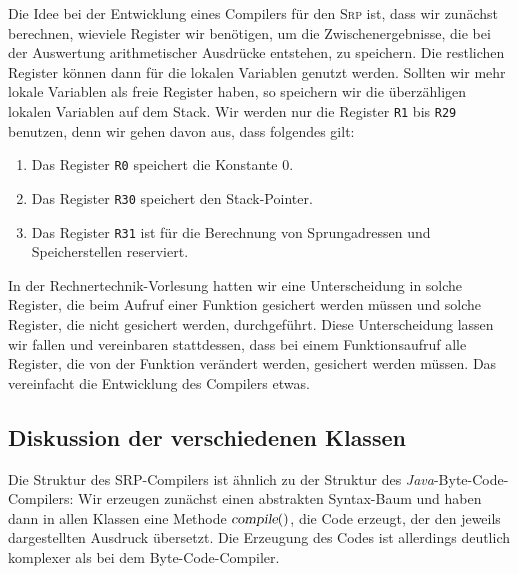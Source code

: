 Die Idee bei der Entwicklung eines Compilers f\"ur den \textsc{Srp} ist, dass wir zun\"achst
berechnen, wieviele Register wir ben\"otigen, um die 
Zwischenergebnisse, die bei der Auswertung arithmetischer Ausdr\"ucke entstehen, zu
speichern.  Die restlichen Register k\"onnen dann f\"ur die lokalen Variablen genutzt werden.
Sollten wir mehr lokale Variablen als freie Register haben, so speichern wir die
\"uberz\"ahligen lokalen Variablen auf dem Stack.
Wir werden nur die Register \texttt{R1} bis \texttt{R29} benutzen, denn  wir gehen davon 
aus,  dass folgendes gilt:
\begin{enumerate}
\item Das Register \texttt{R0}  speichert die Konstante $0$.
\item Das Register \texttt{R30} speichert den Stack-Pointer.
\item Das Register \texttt{R31} ist f\"ur die Berechnung von Sprungadressen und
      Speicherstellen reserviert.  
\end{enumerate}
In der Rechnertechnik-Vorlesung hatten wir eine Unterscheidung in solche
Register, die beim Aufruf einer Funktion gesichert werden m\"ussen und solche Register, die
nicht gesichert werden, durchgef\"uhrt.  Diese Unterscheidung lassen wir fallen und
vereinbaren stattdessen, dass bei einem Funktionsaufruf alle Register, die von der
Funktion ver\"andert werden, gesichert werden m\"ussen.  
Das vereinfacht die Entwicklung des Compilers etwas.

\subsection{Diskussion der verschiedenen Klassen}
Die Struktur des \textsc{SRP}-Compilers ist \"ahnlich zu der Struktur des
\textsl{Java}-Byte-Code-Compilers:  Wir erzeugen zun\"achst einen abstrakten Syntax-Baum und
haben dann in allen Klassen eine Methode $\textsl{compile}()$, die Code erzeugt, der den jeweils
dargestellten Ausdruck \"ubersetzt.  Die Erzeugung des Codes ist allerdings deutlich
komplexer als bei dem Byte-Code-Compiler.


